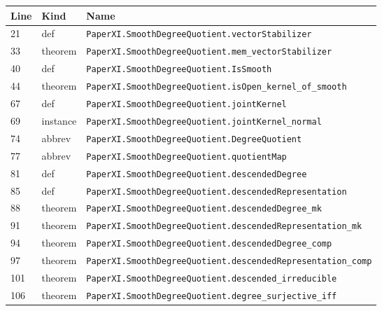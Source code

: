 \documentclass[10pt,oneside]{book}
\begin{document}
\begin{longtable}{@{}p{}p{}p{}@{}}\toprule Line&Kind&Name\\\midrule\endhead

21&def&\nolinkurl{PaperXI.SmoothDegreeQuotient.vectorStabilizer}\\

33&theorem&\nolinkurl{PaperXI.SmoothDegreeQuotient.mem_vectorStabilizer}\\

40&def&\nolinkurl{PaperXI.SmoothDegreeQuotient.IsSmooth}\\

44&theorem&\nolinkurl{PaperXI.SmoothDegreeQuotient.isOpen_kernel_of_smooth}\\

67&def&\nolinkurl{PaperXI.SmoothDegreeQuotient.jointKernel}\\

69&instance&\nolinkurl{PaperXI.SmoothDegreeQuotient.jointKernel_normal}\\

74&abbrev&\nolinkurl{PaperXI.SmoothDegreeQuotient.DegreeQuotient}\\

77&abbrev&\nolinkurl{PaperXI.SmoothDegreeQuotient.quotientMap}\\

81&def&\nolinkurl{PaperXI.SmoothDegreeQuotient.descendedDegree}\\

85&def&\nolinkurl{PaperXI.SmoothDegreeQuotient.descendedRepresentation}\\

88&theorem&\nolinkurl{PaperXI.SmoothDegreeQuotient.descendedDegree_mk}\\

91&theorem&\nolinkurl{PaperXI.SmoothDegreeQuotient.descendedRepresentation_mk}\\

94&theorem&\nolinkurl{PaperXI.SmoothDegreeQuotient.descendedDegree_comp}\\

97&theorem&\nolinkurl{PaperXI.SmoothDegreeQuotient.descendedRepresentation_comp}\\

101&theorem&\nolinkurl{PaperXI.SmoothDegreeQuotient.descended_irreducible}\\

106&theorem&\nolinkurl{PaperXI.SmoothDegreeQuotient.degree_surjective_iff}\\


\end{longtable}
\end{document}
